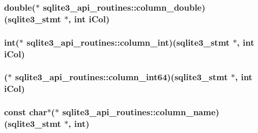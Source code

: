 \hypertarget{structsqlite3__api__routines_afd21003df28cb46354c00599b90e6de5}{
\subsubsection[{column\-\_\-double}]{\setlength{\rightskip}{0pt plus 5cm}double($\ast$ sqlite3\-\_\-api\-\_\-routines\-::column\-\_\-double)({\bf sqlite3\-\_\-stmt} $\ast$, int i\-Col)}}\label{structsqlite3__api__routines_afd21003df28cb46354c00599b90e6de5}
\hypertarget{structsqlite3__api__routines_a6211d95cf114f26cb48eed02d3b5eb70}{
\subsubsection[{column\-\_\-int}]{\setlength{\rightskip}{0pt plus 5cm}int($\ast$ sqlite3\-\_\-api\-\_\-routines\-::column\-\_\-int)({\bf sqlite3\-\_\-stmt} $\ast$, int i\-Col)}}\label{structsqlite3__api__routines_a6211d95cf114f26cb48eed02d3b5eb70}
\hypertarget{structsqlite3__api__routines_a523a8d125fe83c9ea45eb4057a4d2458}{
\subsubsection[{column\-\_\-int64}]{($\ast$ sqlite3\-\_\-api\-\_\-routines\-::column\-\_\-int64)({\bf sqlite3\-\_\-stmt} $\ast$, int i\-Col)}}\label{structsqlite3__api__routines_a523a8d125fe83c9ea45eb4057a4d2458}
\hypertarget{structsqlite3__api__routines_a3bafa95a9ba845fa19408e9c3ac9aa69}{
\subsubsection[{column\-\_\-name}]{\setlength{\rightskip}{0pt plus 5cm}const char$\ast$($\ast$ sqlite3\-\_\-api\-\_\-routines\-::column\-\_\-name)({\bf sqlite3\-\_\-stmt} $\ast$, int)}}\label{structsqlite3__api__routines_a3bafa95a9ba845fa19408e9c3ac9aa69}
